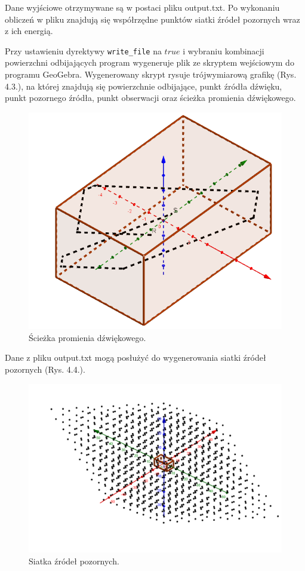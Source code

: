 Dane wyjściowe otrzymywane są w postaci pliku output.txt. Po wykonaniu obliczeń w pliku znajdują się współrzędne punktów siatki źródeł pozornych wraz z ich energią.

Przy ustawieniu dyrektywy \verb|write_file| na $true$ i wybraniu kombinacji powierzchni odbijających program wygeneruje plik ze skryptem wejściowym do programu GeoGebra. Wygenerowany skrypt rysuje trójwymiarową grafikę (Rys. 4.3.), na której znajdują się powierzchnie odbijające, punkt źródła dźwięku, punkt pozornego źródła, punkt obserwacji oraz ścieżka promienia dźwiękowego.
\begin{figure}[h]
        \centering
                \centering
                \includegraphics[width=12cm]{rys10}
	\caption{Ścieżka promienia dźwiękowego.}
\end{figure}
Dane z pliku output.txt mogą posłużyć do wygenerowania siatki źródeł pozornych (Rys. 4.4.).
\begin{figure}[h]
        \centering
                \centering
                \includegraphics[width=12cm]{rys11}
	\caption{Siatka źródeł pozornych.}
\end{figure}













